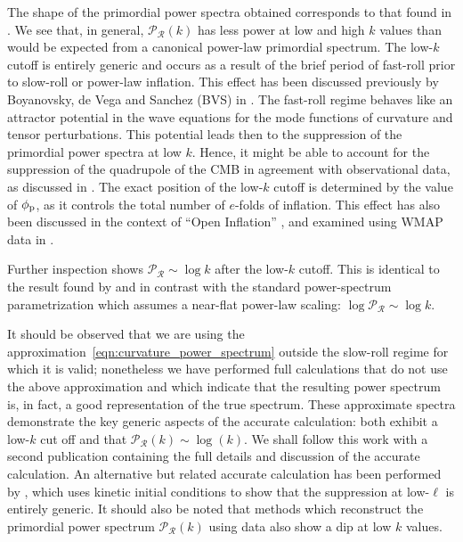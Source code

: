 The shape of the primordial power spectra obtained corresponds to that found in \citep{lasenby_closed_2003}. We see that, in general, $\mathcal{P}_\mathcal{R}(k)$ has less power at low and high $k$ values than would be expected from a canonical power-law primordial spectrum.  The low-$k$ cutoff is entirely generic and occurs as a result of the brief period of fast-roll prior to slow-roll or power-law inflation.  This effect has been discussed previously by Boyanovsky, de Vega and Sanchez (BVS) in \citep{boyanovsky_cmb_2006}. The fast-roll regime behaves like an attractor potential in the wave equations for the mode functions of curvature and tensor perturbations. This potential leads then to the suppression of the primordial power spectra at low $k$.  Hence, it might be able to account for the suppression of the quadrupole of the CMB in agreement with observational data, as discussed in \citep{boyanovsky_cmb_2006-1}.  The exact position of the low-$k$ cutoff is determined by the value of $\phi_{\mathrm{p}}$, as it controls the total number of $e$-folds of inflation. This effect has also been discussed in the context of ``Open Inflation'' \citep{Yamauchi_strings_2011,Linde_open_1999,Linde_toy_1999}, and examined using WMAP data in \citet{Contaldi_suppress_2003}.

Further inspection shows $\mathcal{P}_\mathcal{R} \sim \log k$ after the low-$k$ cutoff. This is identical to the result found by \citet{lasenby_closed_2003} and in contrast with the standard power-spectrum parametrization which assumes a near-flat power-law scaling: $\log\mathcal{P}_\mathcal{R}\sim \log k$. 

 
It should be observed that we are using the approximation~\eqref{eqn:curvature_power_spectrum} outside the slow-roll regime for which it is valid; nonetheless we have performed full calculations that do not use the above approximation and which indicate that the resulting power spectrum is, in fact, a good representation of the true spectrum. These approximate spectra demonstrate the key generic aspects of the accurate calculation: both exhibit a low-$k$ cut off and that $\mathcal{P}_\mathcal{R}(k) \sim \log(k)$.  We shall follow this work with a second publication containing the full details and discussion of the accurate calculation. An alternative but related accurate calculation has been performed by \citep{Lello_tensor_2013}, which uses kinetic initial conditions to show that the suppression at low-$\ell$ is entirely generic. It should also be noted that methods which reconstruct the primordial power spectrum $\mathcal{P}_\mathcal{R}(k)$ \citep{vazquez_reconstruction,Hazra_reconstruction_2013} using data also show a dip at low $k$ values.

